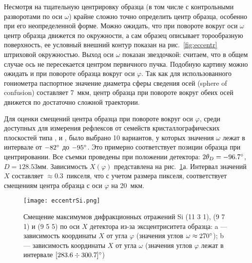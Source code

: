 Несмотря на тщательную центрировку образца (в том числе с контрольными разворотами по оси $\omega$) крайне сложно точно определить центр образца, особенно при его неопределенной форме.
Можно ожидать, что при повороте вокруг оси $\omega$ центр образца движется по окружности, а сам образец описывает торообразную поверхность, ее условный внешний контур показан на рис.~\ref{fig:eccentr} штриховой окружностью.
Выход оси $\omega$ показан звездочкой: считаем, что в общем случае ось не пересекается центром первичного пучка.
Подобную картину можно ожидать и при повороте образца вокруг оси $\varphi$.
Так как для использованного гониометра паспортное значение диаметра сферы сведения осей (sphere of confusion) составляет 7~мкм, центр образца при повороте вокруг обеих осей движется по достаточно сложной траектории.

Для оценки смещений центра образца при повороте вокруг оси $\varphi$, среди доступных для измерения рефлексов от семейств кристаллографических плоскостей типа ,  и , было выбрано 10 вариантов, у которых значения $\omega$ лежат в интервале от $-82^\circ$ до $-95^\circ$.
Это примерно соответствует позиции образца при центрировании.
Все съемки проведены при положении детектора: $2\theta_D = -96.7^\circ$, $D = 128.53\unit{мм}$.
Зависимость $X(\varphi)$ представлена на рис.~\ref{fig:eccentrSi}а.
Интервал значений $X$ составляет $\approx 0.3$~пикселя, что с учетом размера пикселя, соответствует смещениям центра образца с оси $\varphi$ на 20~мкм.

\begin{figure}[ht!]
    \centering
    \texttt{[image: eccentrSi.png]}
    \caption{
        Смещение максимумов дифракционных отражений Si \hkl(11 3 1), \hkl(9 7 1) и \hkl(9 5 5) по оси $X$ детектора из-за эксцентриситета образца: a --- зависимость координаты $X$ от угла $\varphi$ (значения углов $\omega \approx 270^\circ$);
        b --- зависимость координаты $X$ от угла $\omega$ (значения углов $\varphi$ лежат в интервале $[283.6\div300.7]^\circ$)
    }%
    \label{fig:eccentrSi}
\end{figure}

